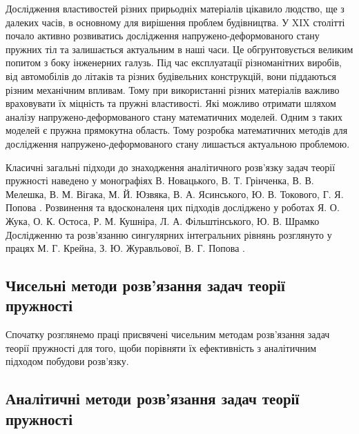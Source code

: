 
Дослідження властивостей різних прирьодніх матеріалів цікавило людство, ще з далеких часів,
в основному для вирішення проблем будівництва.
У XIX столітті почало активно розвиватись дослідження напружено-деформованого стану пружних тіл та залишається актуальним в наші часи.
Це обгрунтовується великим попитом з боку інженерних галузь.
Під час експлуатації різноманітних виробів, від автомобілів до літаків та різних будівельних конструкцій, вони піддаються різним механічним впливам.
Тому при використанні різних матеріалів важливо враховувати їх міцність та пружні властивості.
Які можливо отримати шляхом аналізу напружено-деформованого стану математичних моделей.
Одним з таких моделей є пружна прямокутна область.
Тому розробка математичних методів для дослідження напружено-деформованого стану лишається актуальною проблемою.

Класичні загальні підходи до знаходження аналітичного розв'язку задач теорії пружності наведено у монографіях
В. Новацького, В. Т. Грінченка, В. В. Мелешка, В. М. Вігака, М. Й. Юзвяка, В. А. Ясинського, Ю. В. Токового, Г. Я. Попова \cite{novacki_1, meleshko_1, vihak_1, vihak_2, popov_1}.
Розвинення та вдосконаленя цих підходів досліджено у роботах Я. О. Жука, О. К. Остоса, Р. М. Кушніра, Л. А. Фільштінського, Ю. В. Шрамко \cite{zhuk_1,kushnir_1, filshtin_1}
Дослідженню та розв'язанню сингулярних інтегральних рівнянь розглянуто у працях М. Г. Крейна, З. Ю. Журавльової, В. Г. Попова \cite{kreyn_1, zhuravleva_1,popov_v_1}.

\subsection{Чисельні методи розв'язання задач теорії пружності}
Спочатку розглянемо праці присвячені чисельним методам розв'язання задач теорії пружності
для того, щоби порівняти їх ефективність з аналітичним підходом побудови розв'язку.



\subsection{Аналітичні методи розв'язання задач теорії пружності}